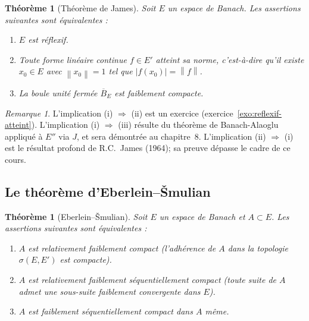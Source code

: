\documentclass[a4paper,12pt]{book}
\newcommand{\norm}[1]{\left\| #1 \right\|}
\newcommand{\abs}[1]{\left| #1 \right|}
\theoremstyle{definition}
\theoremstyle{plain}
\newtheorem{theoreme}[definition]{Théorème}
\theoremstyle{remark}
\newtheorem{remarque}[definition]{Remarque}
\begin{document}
\begin{theoreme}[Théorème de James]
\label{thm:james}
Soit $E$ un espace de Banach. Les assertions suivantes sont équivalentes :
\begin{enumerate}[label=(\roman*)]
  \item $E$ est réflexif.
  \item Toute forme linéaire continue $f \in E'$ atteint sa norme, c'est-à-dire
    qu'il existe $x_0 \in E$ avec $\norm{x_0} = 1$ tel que $\abs{f(x_0)} = \norm{f}$.
  \item La boule unité fermée $\overline{B}_E$ est faiblement compacte.
\end{enumerate}
\end{theoreme}

\begin{remarque}
L'implication (i) $\Rightarrow$ (ii) est un exercice (exercice~\ref{exo:reflexif-atteint}).
L'implication (i) $\Rightarrow$ (iii) résulte du théorème de Banach-Alaoglu appliqué à
$E''$ via $J$, et sera démontrée au chapitre~8. L'implication (ii) $\Rightarrow$ (i)
est le résultat profond de R.C.~James (1964);
sa preuve dépasse le cadre de ce cours.
\end{remarque}

\subsection{Le théorème d'Eberlein--\v{S}mulian}
\label{subsec:eberlein-smulian}

\begin{theoreme}[Eberlein--\v{S}mulian]
\label{thm:eberlein-smulian}
Soit $E$ un espace de Banach et $A \subset E$. Les assertions suivantes sont
équivalentes :
\begin{enumerate}[label=(\roman*)]
  \item $A$ est relativement faiblement compact
    (l'adhérence de $A$ dans la topologie $\sigma(E,E')$ est compacte).
  \item $A$ est relativement faiblement séquentiellement compact (toute suite de $A$
    admet une sous-suite faiblement convergente dans $E$).
  \item $A$ est faiblement séquentiellement compact
    dans $A$ même.
\end{enumerate}
\end{theoreme}
\end{document}
